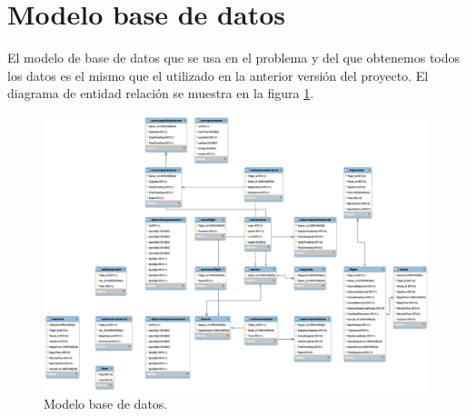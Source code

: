 \section{Modelo base de datos}
El modelo de base de datos que se usa en el problema y del que obtenemos todos los datos es el mismo que el utilizado en la anterior versión del proyecto.  El diagrama de entidad relación se muestra en la figura \ref{fig: Modelo BBDD}.
\begin{figure}[H]
	\begin{center}
		\centering
		\includegraphics[width=1\textwidth]{./imagenes/descripcion_problema/bbdd.png}
		\caption{Modelo base de datos.}
		\label{fig: Modelo BBDD}
	\end{center}
\end{figure}
